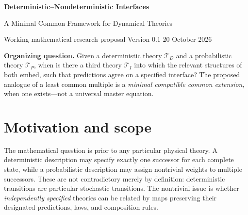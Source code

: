\documentclass[11pt,letterpaper]{article}
\theoremstyle{definition}
\theoremstyle{remark}
\newcommand{\TT}{\mathcal T}
\begin{document}
\begin{center}
{\Large\bfseries\color{navy} Deterministic--Nondeterministic Interfaces}\par
\vspace{5pt}
{\large A Minimal Common Framework for Dynamical Theories}\par
\vspace{8pt}
{\small Working mathematical research proposal \textbullet{} Version 0.1 \textbullet{} 20 October 2026}
\end{center}
\vspace{5pt}
\begin{abstract}
We propose a narrow, mathematical \emph{interface theory of theories} (DNI) in which deterministic dynamics, possibilistic nondeterminism, and stochastic dynamics can be related without identifying their internal descriptions. The basic interface is specified by a deterministic map, an observable readout, and a probabilistic preparation kernel. Two commuting equations give exact agreement of observable evolution. We prove preservation of iterated dynamics and finite-dimensional trajectory laws, construct a deterministic realization for every finite-state Markov chain, establish an obstruction to \emph{finite}-state deterministic realization of indefinitely many independent nondegenerate binary outcomes, and derive a finite-time stability bound for approximately commuting interfaces. We then separate dynamical realizability from the more general question of consistently amalgamating mathematical theories over a shared observational language. The proposal deliberately makes no physical identification or claim of a resolution of quantum gravity. Established constructions and genuinely open interface problems are distinguished throughout.
\end{abstract}

\begin{mainbox}
\textbf{Organizing question.} Given a deterministic theory $\TT_D$ and a probabilistic theory $\TT_P$, when is there a third theory $\TT_I$ into which the relevant structures of both embed, such that predictions agree on a specified interface? The proposed analogue of a least common multiple is a \emph{minimal compatible common extension}, when one exists---not a universal master equation.
\end{mainbox}

\section{Motivation and scope}
The mathematical question is prior to any particular physical theory. A deterministic description may specify exactly one successor for each complete state, while a probabilistic description may assign nontrivial weights to multiple successors. These are not contradictory merely by definition: deterministic transitions are particular stochastic transitions. The nontrivial issue is whether \emph{independently specified} theories can be related by maps preserving their designated predictions, laws, and composition rules.
\end{document}
